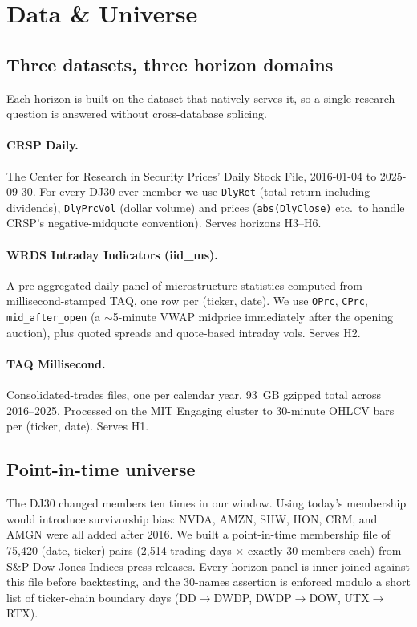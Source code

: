 \documentclass[10pt,conference,compsoc]{IEEEtran}
\begin{document}
\section{Data \& Universe}
\label{sec:data}

\subsection{Three datasets, three horizon domains}

Each horizon is built on the dataset that natively serves it, so a
single research question is answered without cross-database splicing.

\paragraph{CRSP Daily.} The Center for Research in Security
Prices' Daily Stock File, 2016-01-04 to 2025-09-30. For every DJ30
ever-member we use \texttt{DlyRet} (total return including dividends),
\texttt{DlyPrcVol} (dollar volume) and prices (\texttt{abs(DlyClose)}
etc.\ to handle CRSP's negative-midquote convention). Serves horizons
H3--H6.

\paragraph{WRDS Intraday Indicators (iid\_ms).} A pre-aggregated
daily panel of microstructure statistics computed from
millisecond-stamped TAQ, one row per (ticker, date). We use
\texttt{OPrc}, \texttt{CPrc}, \texttt{mid\_after\_open}
(a $\sim$5-minute VWAP midprice immediately after the opening auction),
plus quoted spreads and quote-based intraday vols. Serves H2.

\paragraph{TAQ Millisecond.} Consolidated-trades files, one per
calendar year, 93~GB gzipped total across 2016--2025. Processed on
the MIT Engaging cluster to 30-minute OHLCV bars per (ticker,
date). Serves H1.

\subsection{Point-in-time universe}

The DJ30 changed members ten times in our window. Using today's
membership would introduce survivorship bias: NVDA, AMZN, SHW, HON,
CRM, and AMGN were all added after 2016. We built a point-in-time
membership file of 75{,}420 (date, ticker) pairs (2{,}514 trading
days $\times$ exactly 30 members each) from S\&P Dow Jones Indices
press releases. Every horizon panel is inner-joined against this
file before backtesting, and the 30-names assertion is enforced
modulo a short list of ticker-chain boundary days (DD$\to$DWDP,
DWDP$\to$DOW, UTX$\to$RTX).
\end{document}
